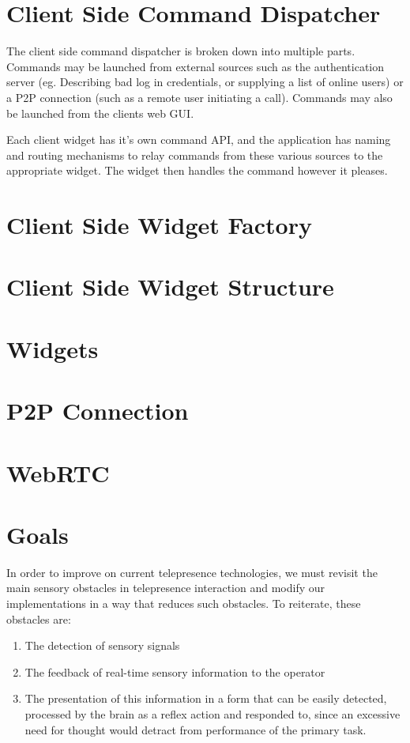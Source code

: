 \documentclass[a4paper,12pt]{report}
\begin{document}
\section{Client Side Command Dispatcher}
The client side command dispatcher is broken down into multiple parts. Commands may be launched from external sources such as the authentication server (eg. Describing bad log in credentials, or supplying a list of online users) or a P2P connection (such as a remote user initiating a call). Commands may also be launched from the clients web GUI.

Each client widget has it's own command API, and the application has naming and routing mechanisms to relay commands from these various sources to the appropriate widget. The widget then handles the command however it pleases.
\section{Client Side Widget Factory}
\section{Client Side Widget Structure}
\section{Widgets}
\section{P2P Connection}
\section{WebRTC}
\section{Goals}

In order to improve on current telepresence technologies, we must revisit the main sensory obstacles in telepresence interaction and modify our implementations in a way that reduces such obstacles. To reiterate, these obstacles are:
	\begin{enumerate}
		\item The detection of sensory signals
		\item The feedback of real-time sensory information to the operator
		\item The presentation of this information in a form that can be easily detected, processed by the brain as a reflex action and responded to, since an excessive need for thought would detract from performance of the primary task.
	\end{enumerate}
	\begin{flushright}
		\cite{540147}
	\end{flushright}
\end{document}
